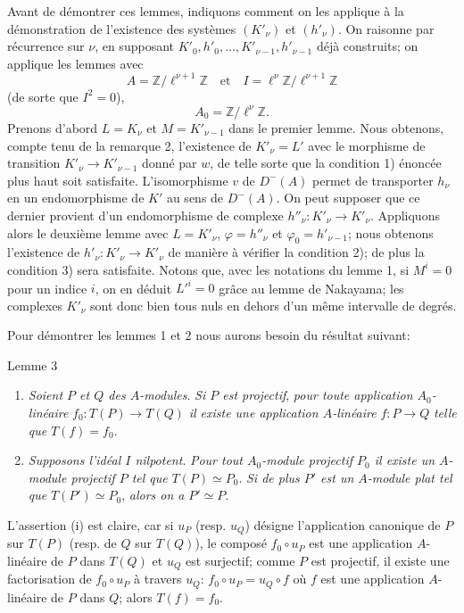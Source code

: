 Avant de démontrer ces lemmes, indiquons comment on les applique à la démonstration de l'existence des systèmes $(K'_\nu)$ et $(h'_\nu)$. On raisonne par récurrence sur $\nu$, en supposant $K'_0,h'_0,\ldots,K'_{\nu-1},h'_{\nu-1}$ déjà construits; on applique les lemmes avec
\[
A=\mathbb{Z}/\ell^{\nu+1}\mathbb{Z}
\quad\text{et}\quad
I=\ell^\nu\mathbb{Z}/\ell^{\nu+1}\mathbb{Z}
\]
(de sorte que $I^2=0$),
\[
A_0=\mathbb{Z}/\ell^\nu\mathbb{Z}.
\]
Prenons d'abord $L=K_\nu$ et $M=K'_{\nu-1}$ dans le premier lemme. Nous obtenons, compte tenu de la remarque 2, l'existence de $K'_\nu=L'$ avec le morphisme de transition $K'_\nu\to K'_{\nu-1}$ donné par $w$, de telle sorte que la condition 1) énoncée plus haut soit satisfaite. L'isomorphisme $v$ de $D^-(A)$ permet de transporter $h_\nu$ en un endomorphisme de $K'$ au sens de $D^-(A)$. On peut supposer que ce dernier provient d'un endomorphisme de complexe $h''_\nu:K'_\nu\to K'_\nu$. Appliquons alors le deuxième lemme avec $L=K'_\nu$, 
$\varphi=h''_\nu$ et $\varphi_0=h'_{\nu-1}$;
nous obtenons l'existence de $h'_\nu:K'_\nu\to K'_\nu$ de manière à vérifier la condition 2); de plus la condition 3) sera satisfaite. Notons que, avec les notations du lemme 1, si $M^i=0$ pour un indice $i$, on en déduit $L'^i=0$ grâce au lemme de Nakayama; les complexes $K'_\nu$ sont donc bien tous nuls en dehors d'un même intervalle de degrés.

Pour démontrer les lemmes 1 et 2 nous aurons besoin du résultat suivant:

\begin{statement}{Lemme 3}
\begin{enumerate}[label=(\roman*)]
\item \emph{Soient $P$ et $Q$ des $A$-modules}. \emph{Si $P$ est projectif}, \emph{pour toute application $A_0$-linéaire} $f_0:T(P)\to T(Q)$ \emph{il existe une application $A$-linéaire} $f:P\to Q$ \emph{telle que} $T(f)=f_0$.
\item \emph{Supposons l'idéal $I$ nilpotent}. \emph{Pour tout $A_0$-module projectif $P_0$ il existe un $A$-module projectif $P$ tel que} $T(P)\simeq P_0$. \emph{Si de plus $P'$ est un $A$-module plat tel que} $T(P')\simeq P_0$, \emph{alors on a} $P'\simeq P$.
\end{enumerate}
\end{statement}

L'assertion (i) est claire, car si $u_P$ (resp. $u_Q$) désigne l'application canonique de $P$ sur $T(P)$ (resp. de $Q$ sur $T(Q)$), le composé $f_0\circ u_P$ est une application $A$-linéaire de $P$ dans $T(Q)$ et $u_Q$ est surjectif; comme $P$ est projectif, il existe une factorisation de $f_0\circ u_P$ à travers $u_Q$: $f_0\circ u_P=u_Q\circ f$ où $f$ est une application $A$-linéaire de $P$ dans $Q$; alors $T(f)=f_0$.

